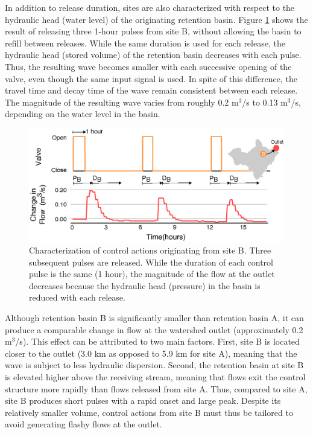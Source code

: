 In addition to release duration, sites are also characterized with respect to the hydraulic head (water level) of the originating retention basin. Figure \ref{fig:4} shows the result of releasing three 1-hour pulses from site B, without allowing the basin to refill between releases. While the same duration is used for each release, the hydraulic head (stored volume) of the retention basin decreases with each pulse. Thus, the resulting wave becomes smaller with each successive opening of the valve, even though the same input signal is used. In spite of this difference, the travel time and decay time of the wave remain consistent between each release.
The magnitude of the resulting wave varies from roughly 0.2 m$^3$/s to 0.13 m$^3$/s, depending on the water level in the basin. 

\begin{figure}
    \centering
    \includegraphics[width=\textwidth]{gfx/Chapter-2/Figure5_F.eps}
    \caption{Characterization of control actions originating from site B. Three subsequent pulses are released. While the duration of each control pulse is the same (1 hour), the magnitude of the flow
    at the outlet decreases because the hydraulic head (pressure) in the basin is reduced with each release.
    }
    \label{fig:4}
\end{figure}

Although retention basin B is significantly smaller than retention basin A, it can produce a comparable change in flow at the watershed outlet (approximately 0.2 m$^3$/s). This effect can be attributed to two main factors. First, site B is located closer to the outlet (3.0 km as opposed to 5.9 km for site A), meaning that the wave is subject to less hydraulic dispersion. Second, the retention basin at site B is elevated higher above the receiving stream, meaning that flows exit the control structure more rapidly than flows released from site A. Thus, compared to site A, site B produces short pulses with a rapid onset and large peak. Despite its relatively smaller volume, control actions from site B must thus be tailored to avoid generating flashy flows at the outlet.

